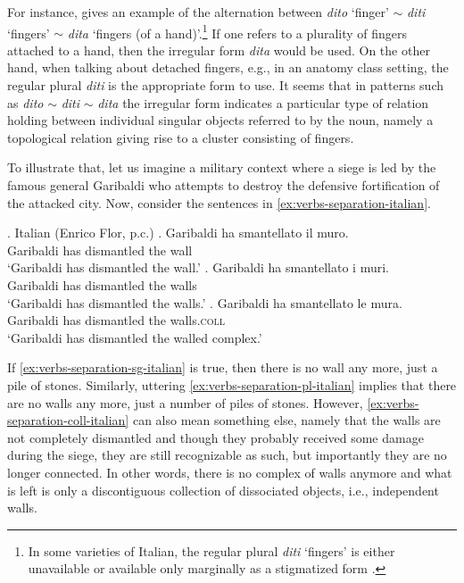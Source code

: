 For instance, \citet{kucerova2015two} gives an example of the alternation between \textit{dito} `finger' $\sim$ \textit{diti} `fingers' $\sim$ \textit{dita} `fingers (of a hand)'.\footnote{In some varieties of Italian, the regular plural \textit{diti} `fingers' is either unavailable or available only marginally as a stigmatized form \citep[p. 126]{acquaviva2008lexical}.} If one refers to a plurality of fingers attached to a hand, then the irregular form \textit{dita} would be used. On the other hand, when talking about detached fingers, e.g., in an anatomy class setting, the regular plural \textit{diti} is the appropriate form to use. It seems that in patterns such as \textit{dito} $\sim$ \textit{diti} $\sim$ \textit{dita} the irregular form indicates a particular type of relation holding between individual singular objects referred to by the noun, namely a topological relation giving rise to a cluster consisting of fingers.

To illustrate that, let us imagine a military context where a siege is led by the famous general Garibaldi who attempts to destroy the defensive fortification of the attacked city. Now, consider the sentences in \ref{ex:verbs-separation-italian}. 

\ex.\label{ex:verbs-separation-italian} Italian (Enrico Flor, p.c.)
\ag. Garibaldi ha smantellato il muro.\label{ex:verbs-separation-sg-italian}\\
Garibaldi has dismantled the wall\\
`Garibaldi has dismantled the wall.'
\bg. Garibaldi ha smantellato i muri.\label{ex:verbs-separation-pl-italian}\\
Garibaldi has dismantled the walls\\
`Garibaldi has dismantled the walls.'
\bg. Garibaldi ha smantellato le mura.\label{ex:verbs-separation-coll-italian}\\
Garibaldi has dismantled the walls\textsc{.coll}\\
`Garibaldi has dismantled the walled complex.'

If \ref{ex:verbs-separation-sg-italian} is true, then there is no wall any more, just a pile of stones. Similarly, uttering \ref{ex:verbs-separation-pl-italian} implies that there are no walls any more, just a number of piles of stones. However, \ref{ex:verbs-separation-coll-italian} can also mean something else, namely that the walls are not completely dismantled and though they probably received some damage during the siege, they are still recognizable as such, but importantly they are no longer connected. In other words, there is no complex of walls anymore and what is left is only a discontiguous collection of dissociated objects, i.e., independent walls.

